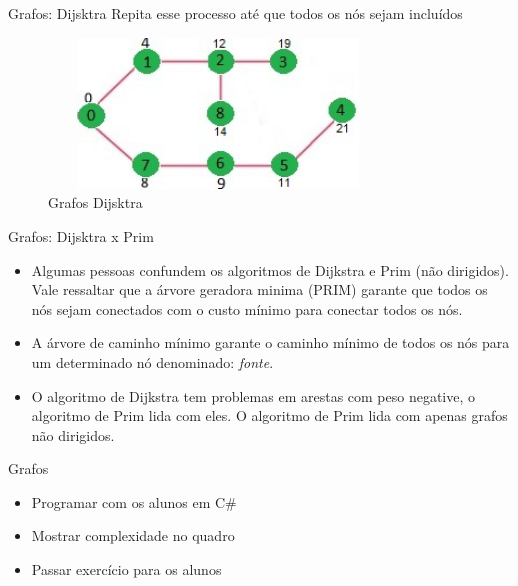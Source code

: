 \begin{frame}
	\begin{block}{Grafos: Dijsktra}
		Repita esse processo até que todos os nós sejam incluídos
		\begin{figure}[!htb]
			\centering	  
			\includegraphics[height=4cm, width = 9cm]{./pic/DIJ5.jpg}
			\caption{Grafos Dijsktra}
		\end{figure}
	\end{block}
\end{frame}

\begin{frame}
	\begin{block}{Grafos: Dijsktra x Prim}
		\begin{itemize}
			\item Algumas pessoas confundem os algoritmos de Dijkstra e Prim (não dirigidos). Vale ressaltar que a árvore geradora minima (PRIM) garante que todos os nós sejam conectados com o custo mínimo para conectar todos os nós.
			\item A árvore de caminho mínimo garante o caminho mínimo de todos os nós para um determinado nó denominado: \emph{fonte}.
			\item O algoritmo de Dijkstra tem problemas em arestas com peso negative, o algoritmo de Prim lida com eles. O algoritmo de Prim lida com apenas grafos não dirigidos.
		\end{itemize}
	\end{block}
\end{frame}

\begin{frame}
	\begin{block}{Grafos}
		\begin{itemize}
			\item Programar com os alunos em C\#	
			\item Mostrar complexidade no quadro	
			\item Passar exercício para os alunos
		\end{itemize}
	\end{block}
\end{frame}


